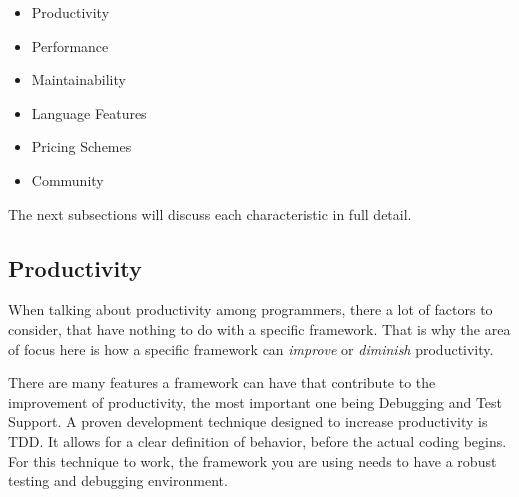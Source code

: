 \begin{itemize}
\item Productivity
\item Performance
\item Maintainability
\item Language Features
\item Pricing Schemes
\item Community
\end{itemize}
The next subsections will discuss each characteristic in full detail.

\subsection{Productivity}%
When talking about productivity among programmers, there a lot of factors to consider, that have nothing to do with a specific framework. That is why the area of focus here is how a specific framework can \textit{improve} or \textit{diminish} productivity.

There are many features a framework can have that contribute to the improvement of productivity, the most important one being Debugging and Test Support. A proven development technique designed to increase productivity is \ac{TDD}. It allows for a clear definition of behavior, before the actual coding begins. For this technique to work, the framework you are using needs to have a robust testing and debugging environment.

